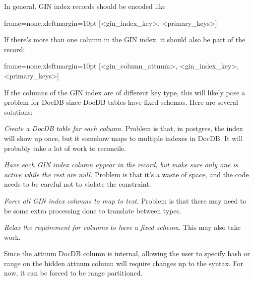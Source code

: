 In general, GIN index records should be encoded like

\begin{textcode*}{frame=none,xleftmargin=10pt}
[<gin_index_key>, <primary_keys>]
\end{textcode*}

If there's more than one column in the GIN index, it should also be part of the
record:

\begin{textcode*}{frame=none,xleftmargin=10pt}
[<gin_column_attnum>, <gin_index_key>, <primary_keys>]
\end{textcode*}

If the columns of the GIN index are of different key type, this will likely
pose a problem for DocDB since DocDB tables have fixed schemas.  Here are
several solutions:

\begin{oparts}
\item
  \emph{Create a DocDB table for each column.}  Problem is that, in postgres,
  the index will show up once, but it somehow maps to multiple indexes in
  DocDB.  It will probably take a lot of work to reconcile.
\item
  \emph{Have each GIN index column appear in the record, but make sure only one
  is active while the rest are null.}  Problem is that it's a waste of space,
  and the code needs to be careful not to violate the constraint.
\item
  \emph{Force all GIN index columns to map to text.}  Problem is that there may
  need to be some extra processing done to translate between types.
\item
  \emph{Relax the requirement for columns to have a fixed schema.}  This may
  also take work.
\end{oparts}

Since the attnum DocDB column is internal, allowing the user to specify hash or
range on the hidden attnum column will require changes up to the syntax.  For
now, it can be forced to be range partitioned.
